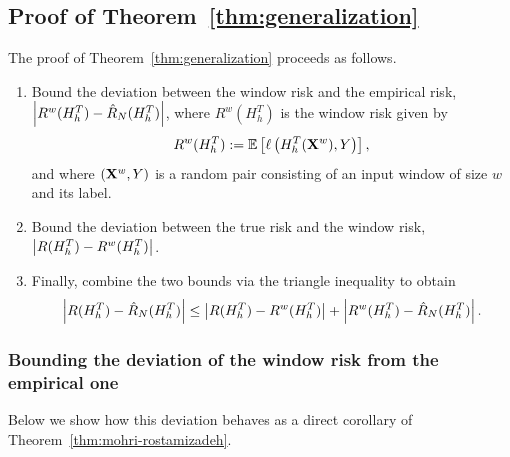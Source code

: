\subsection{Proof of Theorem~\ref{thm:generalization}}
The proof of Theorem~\ref{thm:generalization} proceeds as follows.
\begin{enumerate}
    \item Bound the deviation between the window risk and the empirical risk, $\left| R^w(H^T_h) - \hat{R}_N(H^T_h) \right|$, where $R^w(H^T_h)$ is the window risk given by
    \begin{equation}\label{eq:window-risk}
        R^w(H^T_h) := \mathbb{E}\left[\ell\left(H^T_h({\mathbf{X}}^w), Y\right)\right],
    \end{equation}
    and where $({\mathbf{X}}^w, Y)$ is a random pair consisting of an input window of size $w$ and its label.
    \item Bound the deviation between the true risk and the window risk, $\left| R(H^T_h) - R^w(H^T_h) \right|$. 
    \item Finally, combine the two bounds via the triangle inequality to obtain
    \[
    \left| R(H^T_h) - \hat{R}_N(H^T_h) \right|
    \leq
    \left| R(H^T_h) - R^w(H^T_h) \right|
    +
    \left| R^w(H^T_h) - \hat{R}_N(H^T_h) \right|.
    \]
\end{enumerate}

\subsubsection{Bounding the deviation of the window risk from the empirical one}
Below we show how this deviation behaves as a direct corollary of Theorem~\ref{thm:mohri-rostamizadeh}.

